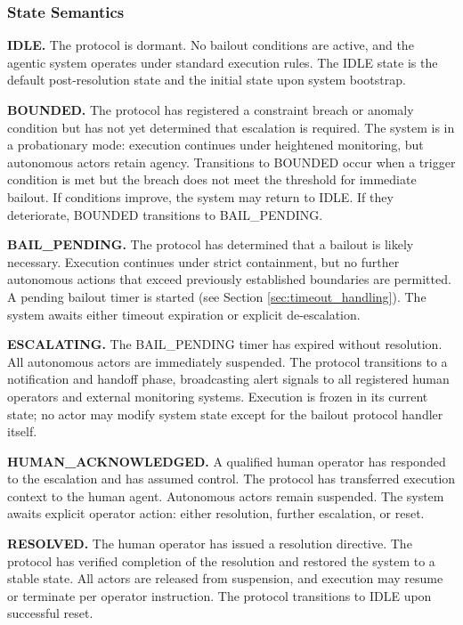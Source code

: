 \subsubsection{State Semantics}

\textbf{IDLE.} The protocol is dormant. No bailout conditions are active, and the agentic system operates under standard execution rules. The IDLE state is the default post-resolution state and the initial state upon system bootstrap.

\textbf{BOUNDED.} The protocol has registered a constraint breach or anomaly condition but has not yet determined that escalation is required. The system is in a probationary mode: execution continues under heightened monitoring, but autonomous actors retain agency. Transitions to BOUNDED occur when a trigger condition is met but the breach does not meet the threshold for immediate bailout. If conditions improve, the system may return to IDLE. If they deteriorate, BOUNDED transitions to BAIL\_PENDING.

\textbf{BAIL\_PENDING.} The protocol has determined that a bailout is likely necessary. Execution continues under strict containment, but no further autonomous actions that exceed previously established boundaries are permitted. A pending bailout timer is started (see Section \ref{sec:timeout_handling}). The system awaits either timeout expiration or explicit de-escalation.

\textbf{ESCALATING.} The BAIL\_PENDING timer has expired without resolution. All autonomous actors are immediately suspended. The protocol transitions to a notification and handoff phase, broadcasting alert signals to all registered human operators and external monitoring systems. Execution is frozen in its current state; no actor may modify system state except for the bailout protocol handler itself.

\textbf{HUMAN\_ACKNOWLEDGED.} A qualified human operator has responded to the escalation and has assumed control. The protocol has transferred execution context to the human agent. Autonomous actors remain suspended. The system awaits explicit operator action: either resolution, further escalation, or reset.

\textbf{RESOLVED.} The human operator has issued a resolution directive. The protocol has verified completion of the resolution and restored the system to a stable state. All actors are released from suspension, and execution may resume or terminate per operator instruction. The protocol transitions to IDLE upon successful reset.

